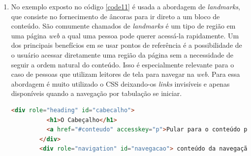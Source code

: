 {\begin{enumerate}
\begin{itemize}
        {\begin{lstlisting}[language=html,caption={Uso do atributo \textit{tabindex} para adicionar um elemento a ordem de foco}, label=code10]
        <label>
            Primeiro na lista de tabulação:<input type="text">
        </label>
        <div tabindex="0">
        Próximo item na lista de tabulação, mesmo não sendo um elemento que receberia o foco natural
        </div>
        <div>Não será focado pois está sem o tabindex</div>
        \end{lstlisting}}
        \item Adicione o atributo \lstinline{title} aos \textit{links}, ele mostrará uma descrição do lugar pra onde o \textit{link} leva, melhorando a navegação. Ao ter o elemento focado o leitor conseguirá ler o atributo \lstinline{title} e saber a direção que o redirecionamento poderá tomar ou se um elemento novo surgirá, como exemplificado no código \ref{code11}.
        {\begin{lstlisting}[language=html,caption={Uso do atributo \textit{title} para dar uma explicação sobre onde o link leva}, label=code11]
        <a href="#" onclick="abrePopup()" onkeypress="abrePopup()" title="Abre uma janela pop-up com Javascript">Ver mais informações</a>
        \end{lstlisting}}
    \end{itemize}
    \item No exemplo exposto no código \ref{code11} é usada a abordagem de \textit{landmarks}, que consiste no  fornecimento de âncoras para ir direto a um bloco de conteúdo. São comumente chamados de \textit{landmarks} é um tipo de região em uma página \textit{web} a qual uma pessoa pode querer acessá-la rapidamente. Um dos principais benefícios em se usar pontos de referência é a possibilidade de o usuário acessar diretamente uma região da página sem a necessidade de seguir a ordem natural do conteúdo. Isso é especialmente relevante para o caso de pessoas que utilizam leitores de tela para navegar na \textit{web}. Para essa abordagem é muito utilizado o CSS \cite{CSS} deixando-os \textit{links} invisíveis e apenas disponíveis quando a navegação por tabulação se iniciar. 
        {\begin{lstlisting}[language=html,caption={Criação de \textit{landmarks} para acessar pontos de referências através do atalho p}, label=code12]
        <div role="heading" id="cabecalho"> 
          <h1>O Cabeçalho</h1> 
          <a href="#conteudo" accesskey="p">Pular para o conteúdo principals</a> 
        </div> 
        <div role="navigation" id="navegacao"> conteúdo da navegação </div>

\end{lstlisting}}
\end{enumerate}}
